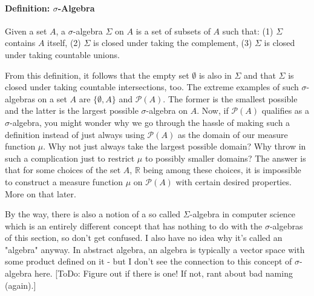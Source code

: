 \paragraph{Definition: $\sigma$-Algebra} \label{Def:SigmaAlgebra} Given a set $A$, a $\sigma$-algebra $\Sigma$ on $A$ is a set of subsets of $A$ such that: (1) $\Sigma$ contains $A$ itself, (2) $\Sigma$ is closed under taking the complement, (3) $\Sigma$ is closed under taking countable unions.

\medskip
From this definition, it follows that the empty set $\emptyset$ is also in $\Sigma$ and that $\Sigma$ is closed under taking countable intersections, too. The extreme examples of such $\sigma$-algebras on a set $A$ are $\{\emptyset, A\}$ and $\mathcal{P}(A)$. The former is the smallest possible and the latter is the largest possible $\sigma$-algebra on $A$. Now, if $\mathcal{P}(A)$ qualifies as a $\sigma$-algebra, you might wonder why we go through the hassle of making such a definition instead of just always using $\mathcal{P}(A)$ as the domain of our measure function $\mu$. Why not just always take the largest possible domain? Why throw in such a complication just to restrict $\mu$ to possibly smaller domains? The answer is that for some choices of the set $A$, $\mathbb{R}$ being among these choices, it is impossible to construct a measure function $\mu$ on $\mathcal{P}(A)$ with certain desired properties. More on that later.

\medskip
By the way, there is also a notion of a so called $\Sigma$-algebra in computer science which is an entirely different concept that has nothing to do with the $\sigma$-algebras of this section, so don't get confused. I also have no idea why it's called an "algebra" anyway. In abstract algebra, an algebra is typically a vector space with some product defined on it - but I don't see the connection to this concept of $\sigma$-algebra here. [ToDo: Figure out if there is one! If not, rant about bad naming (again).]








